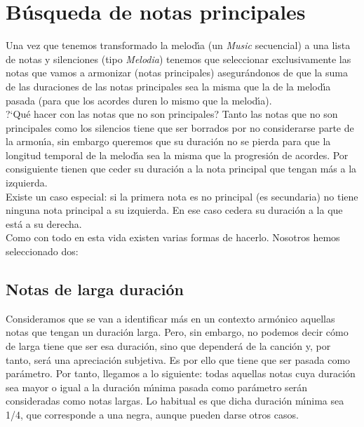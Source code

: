 \section{B\'usqueda de notas principales}
Una vez que tenemos transformado la melod\'\i a (un \emph{Music} secuencial)
a una lista de notas y silenciones (tipo \emph{Melodia}) tenemos que
seleccionar exclusivamente las notas que vamos a armonizar
(notas principales) asegur\'andonos de que la suma de las
duraciones de las notas principales sea la misma que la de la
melod\'\i a pasada (para que los acordes duren lo mismo que la
melod\'\i a).\\
\indent ?`Qu\'e hacer con las notas que no son principales? Tanto las notas que 
no son principales como los silencios tiene que ser borrados por no 
considerarse parte de la armon\'\i a, sin embargo queremos
que su duraci\'on no se pierda para que la longitud temporal de 
la melod\'\i a sea la misma que la progresi\'on de acordes. Por consiguiente tienen
que ceder su duraci\'on a la nota principal que tengan m\'as a la izquierda.\\
\indent Existe un caso especial: si la primera nota es no principal (es secundaria)
no tiene ninguna nota principal a su izquierda. En ese caso cedera 
su duraci\'on a la que est\'a a su derecha.\\
Como con todo en esta vida existen varias formas de hacerlo. Nosotros
hemos seleccionado dos:

\subsection{Notas de larga duraci\'on}
Consideramos que se van a identificar m\'as en un contexto arm\'onico 
aquellas notas que tengan un duraci\'on larga. Pero, sin embargo,
no podemos decir c\'omo de larga tiene que ser esa duraci\'on, sino que depender\'a de la
canci\'on y, por tanto, ser\'a una apreciaci\'on subjetiva. Es por ello
que tiene que ser pasada como par\'ametro. Por tanto, llegamos a lo siguiente: todas aquellas notas
cuya duraci\'on sea mayor o igual a la duraci\'on m\'\i nima
pasada como par\'ametro ser\'an consideradas como notas largas. Lo 
habitual es que dicha duraci\'on m\'\i nima sea 1/4, que corresponde
a una negra, aunque pueden darse otros casos.

